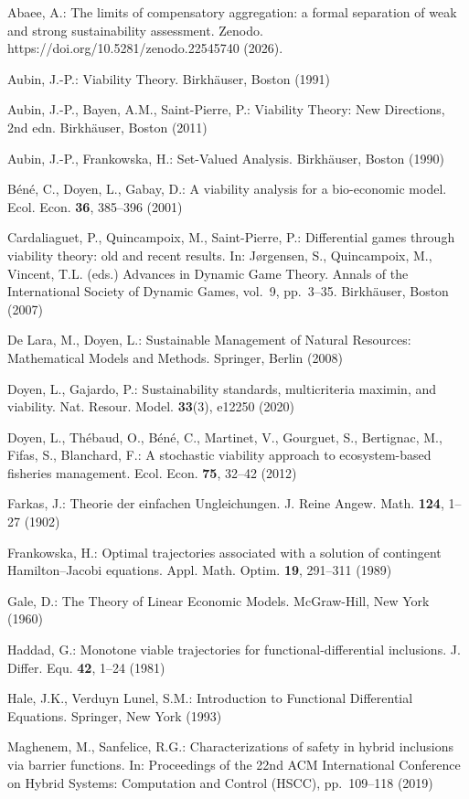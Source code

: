 \documentclass[11pt]{article}
\theoremstyle{definition}
\begin{document}
Abaee, A.: The limits of compensatory aggregation: a formal separation of weak and strong sustainability assessment. Zenodo. https://doi.org/10.5281/zenodo.22545740 (2026).

Aubin, J.-P.: Viability Theory. Birkh\"auser, Boston (1991)

Aubin, J.-P., Bayen, A.M., Saint-Pierre, P.: Viability Theory: New Directions, 2nd edn. Birkh\"auser, Boston (2011)

Aubin, J.-P., Frankowska, H.: Set-Valued Analysis. Birkh\"auser, Boston (1990)

B\'en\'e, C., Doyen, L., Gabay, D.: A viability analysis for a bio-economic
model. Ecol. Econ. \textbf{36}, 385--396 (2001)

Cardaliaguet, P., Quincampoix, M., Saint-Pierre, P.: Differential games
through viability theory: old and recent results. In: J\o{}rgensen, S.,
Quincampoix, M., Vincent, T.L. (eds.) Advances in Dynamic Game Theory.
Annals of the International Society of Dynamic Games, vol.~9, pp.~3--35.
Birkh\"auser, Boston (2007)

De Lara, M., Doyen, L.: Sustainable Management of Natural Resources:
Mathematical Models and Methods. Springer, Berlin (2008)

Doyen, L., Gajardo, P.: Sustainability standards, multicriteria maximin,
and viability. Nat. Resour. Model. \textbf{33}(3), e12250 (2020)

Doyen, L., Th\'ebaud, O., B\'en\'e, C., Martinet, V., Gourguet, S., Bertignac,
M., Fifas, S., Blanchard, F.: A stochastic viability approach to
ecosystem-based fisheries management. Ecol. Econ. \textbf{75}, 32--42
(2012)

Farkas, J.: Theorie der einfachen Ungleichungen. J. Reine Angew. Math.
\textbf{124}, 1--27 (1902)

Frankowska, H.: Optimal trajectories associated with a solution of
contingent Hamilton--Jacobi equations. Appl. Math. Optim. \textbf{19},
291--311 (1989)

Gale, D.: The Theory of Linear Economic Models. McGraw-Hill, New York
(1960)

Haddad, G.: Monotone viable trajectories for functional-differential
inclusions. J. Differ. Equ. \textbf{42}, 1--24 (1981)

Hale, J.K., Verduyn Lunel, S.M.: Introduction to Functional Differential
Equations. Springer, New York (1993)

Maghenem, M., Sanfelice, R.G.: Characterizations of safety in hybrid
inclusions via barrier functions. In: Proceedings of the 22nd ACM
International Conference on Hybrid Systems: Computation and Control
(HSCC), pp.~109--118 (2019)
\end{document}

